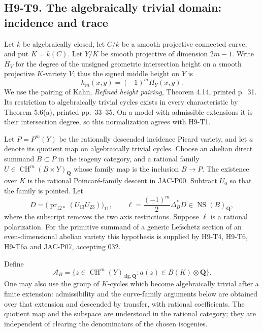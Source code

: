 \documentclass[11pt,a4paper]{article}
\begin{document}

\subsection*{H9-T9. The algebraically trivial domain: incidence and trace}

Let $k$ be algebraically closed, let $C/k$ be a smooth projective connected
curve, and put $K=k(C)$. Let $Y/K$ be smooth projective of dimension
$2m-1$. Write $H_V$ for the degree of the unsigned geometric intersection
height on a smooth projective $K$-variety $V$; thus the signed middle
height on $Y$ is
\[
 h_m(x,y)=(-1)^m H_Y(x,y).
\]
We use the pairing of Kahn, \emph{Refined height pairing}, Theorem 4.14,
printed p.~31. Its restriction to algebraically trivial cycles exists in
every characteristic by Theorem 5.6(a), printed pp.~33--35. On a model
with admissible extensions it is their intersection degree, so this
normalization agrees with H9-T1.

Let $P=P^m(Y)$ be the rationally descended incidence Picard variety, and
let $a$ denote its quotient map on algebraically trivial cycles. Choose
an abelian direct summand $B\subset P$ in the isogeny category, and a
rational family $U\in\operatorname{CH}^m(B\times Y)_{\mathbf Q}$
whose family map is the inclusion $B\to P$. The existence over $K$ is
the rational Poincar\'e-family descent in JAC-P00. Subtract $U_0$ so
that the family is pointed. Let
\[
 D=\bigl(\operatorname{pr}_{12*}(U_{13}U_{23})\bigr)_{11},
 \qquad \ell=\frac{(-1)^m}{2}\Delta_B^*D
       \in\operatorname{NS}(B)_{\mathbf Q},                 \tag{H9.25}
\]
where the subscript removes the two axis restrictions. Suppose $\ell$
is a rational polarization. For the primitive summand of a generic
Lefschetz section of an even-dimensional abelian variety this hypothesis
is supplied by H9-T4, H9-T6, H9-T6a and JAC-P07, accepting 032.

Define
\[
 \mathcal A_B=
 \{z\in\operatorname{CH}^{m}(Y)_{\mathrm{alg},\mathbf Q}:
                      a(z)\in B(K)\otimes\mathbf Q\}.
\]
One may also use the group of $K$-cycles which become algebraically
trivial after a finite extension: admissibility and the curve-family
arguments below are obtained over that extension and descended by
transfer, with rational coefficients. The quotient map and the
subspace are understood in the rational category; they are independent
of clearing the denominators of the chosen isogenies.
\end{document}
